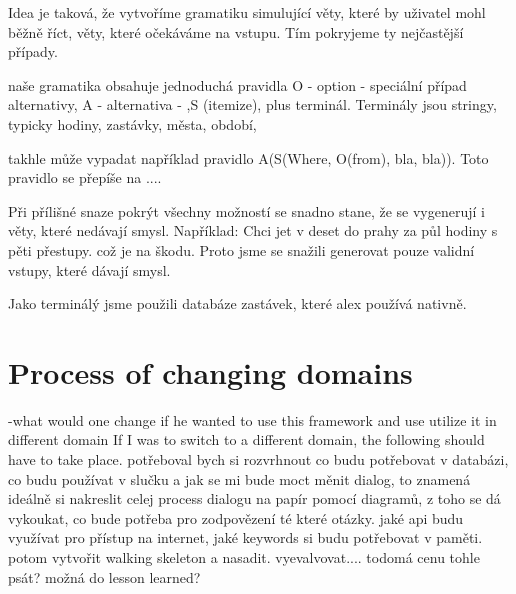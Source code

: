Idea je taková, že vytvoříme gramatiku simulující věty, které by uživatel mohl běžně říct, věty, které očekáváme na vstupu. Tím pokryjeme ty nejčastější případy.

naše gramatika obsahuje jednoduchá pravidla O - option - speciální případ alternativy, A - alternativa - ,S (itemize), plus terminál.
Terminály jsou stringy, typicky hodiny, zastávky, města, období, 

takhle může vypadat například pravidlo A(S(Where, O(from), bla, bla)). 
Toto pravidlo se přepíše na .... 

Při přílišné snaze pokrýt všechny možností se snadno stane, že se vygenerují i věty, které nedávají smysl. Například: Chci jet v deset do prahy za půl hodiny s pěti přestupy. což je na škodu. Proto jsme se snažili generovat pouze validní vstupy, které dávají smysl.

Jako terminálý jsme použili databáze zastávek, které alex používá nativně.


\section{Process of changing domains} 
  -what would one change if he wanted to use this framework and use utilize it in different domain
  If I was to switch to a different domain, the following should have to take place.
  potřeboval bych si rozvrhnout co budu potřebovat v databázi, co budu používat v slučku a jak se mi bude moct měnit dialog, to znamená ideálně si nakreslit celej process dialogu na papír pomocí diagramů, z toho se dá vykoukat, co bude potřeba pro zodpovězení té které otázky. jaké api budu využívat pro přístup na internet, jaké keywords si budu potřebovat v paměti. potom vytvořit walking skeleton a nasadit. vyevalvovat....
  todo{má cenu tohle psát?} možná do lesson learned?
  

